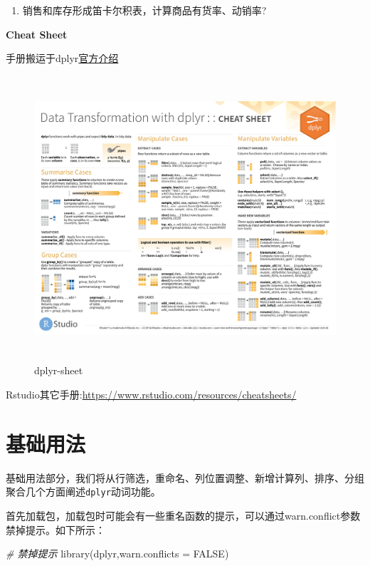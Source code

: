 \documentclass[
]{book}
\newenvironment{Shaded}{\begin{snugshade}}{\end{snugshade}}
\newcommand{\AttributeTok}[1]{\textcolor[rgb]{0.77,0.63,0.00}{#1}}
\newcommand{\CommentTok}[1]{\textcolor[rgb]{0.56,0.35,0.01}{\textit{#1}}}
\newcommand{\ConstantTok}[1]{\textcolor[rgb]{0.00,0.00,0.00}{#1}}
\newcommand{\FunctionTok}[1]{\textcolor[rgb]{0.00,0.00,0.00}{#1}}
\newcommand{\NormalTok}[1]{#1}
\providecommand{\tightlist}{%
  \setlength{\itemsep}{0pt}\setlength{\parskip}{0pt}}
\begin{document}
\begin{enumerate}
\def\labelenumi{\arabic{enumi}.}
\setcounter{enumi}{2}
\tightlist
\item
  销售和库存形成笛卡尔积表，计算商品有货率、动销率?
\end{enumerate}

\textbf{Cheat Sheet}

手册搬运于dplyr\href{https://dplyr.tidyverse.org/}{官方介绍}

\begin{figure}
\centering
\includegraphics[width=1\textwidth,height=4.16667in]{./picture/dplyr/data-transformation.pdf}
\caption{dplyr-sheet}
\end{figure}

Rstudio其它手册:\url{https://www.rstudio.com/resources/cheatsheets/}

\hypertarget{dplyr:usage}{%
\section{基础用法}\label{dplyr:usage}}

基础用法部分，我们将从行筛选，重命名、列位置调整、新增计算列、排序、分组聚合几个方面阐述\texttt{dplyr}动词功能。

首先加载包，加载包时可能会有一些重名函数的提示，可以通过warn.conflict参数禁掉提示。如下所示：

\begin{Shaded}
\begin{Highlighting}[]
\CommentTok{\# 禁掉提示}
\FunctionTok{library}\NormalTok{(dplyr,}\AttributeTok{warn.conflicts =} \ConstantTok{FALSE}\NormalTok{)}
\end{Highlighting}
\end{Shaded}
\end{document}
